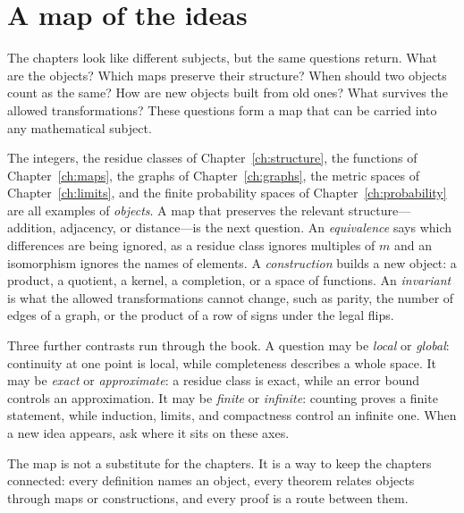 \chapter*{A map of the ideas}
The chapters look like different subjects, but the same questions return. What are the objects? Which maps preserve their structure? When should two objects count as the same? How are new objects built from old ones? What survives the allowed transformations? These questions form a map that can be carried into any mathematical subject.

\begin{center}
\end{center}

The integers, the residue classes of Chapter~\ref{ch:structure}, the functions of Chapter~\ref{ch:maps}, the graphs of Chapter~\ref{ch:graphs}, the metric spaces of Chapter~\ref{ch:limits}, and the finite probability spaces of Chapter~\ref{ch:probability} are all examples of \emph{objects}. A map that preserves the relevant structure---addition, adjacency, or distance---is the next question. An \emph{equivalence} says which differences are being ignored, as a residue class ignores multiples of $m$ and an isomorphism ignores the names of elements. A \emph{construction} builds a new object: a product, a quotient, a kernel, a completion, or a space of functions. An \emph{invariant} is what the allowed transformations cannot change, such as parity, the number of edges of a graph, or the product of a row of signs under the legal flips.

Three further contrasts run through the book. A question may be \emph{local} or \emph{global}: continuity at one point is local, while completeness describes a whole space. It may be \emph{exact} or \emph{approximate}: a residue class is exact, while an error bound controls an approximation. It may be \emph{finite} or \emph{infinite}: counting proves a finite statement, while induction, limits, and compactness control an infinite one. When a new idea appears, ask where it sits on these axes.

The map is not a substitute for the chapters. It is a way to keep the chapters connected: every definition names an object, every theorem relates objects through maps or constructions, and every proof is a route between them.
